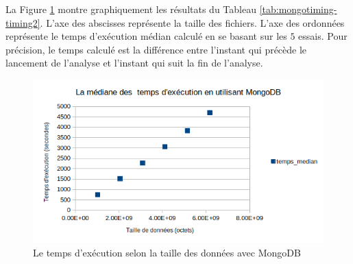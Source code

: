 La Figure \ref{fig:mongodbtiming} montre graphiquement les résultats du Tableau \ref{tab:mongotiming-timing2}. L'axe  des abscisses représente la taille des fichiers. %
L'axe  des ordonnées  représente le temps d'exécution médian calculé en se basant sur les $5$ essais. 
Pour précision, le temps calculé est la différence entre l'instant  qui précède le lancement de l'analyse et l'instant qui suit la fin de l'analyse.
\begin{figure}[h]
	\centering
	\captionsetup{justification=centering}
	\includegraphics[width=0.7\linewidth]{illustrations/medianTime-execution-mongodb}
	\caption{Le temps d'exécution selon la taille des données avec MongoDB}
	\label{fig:mongodbtiming}
\end{figure}










